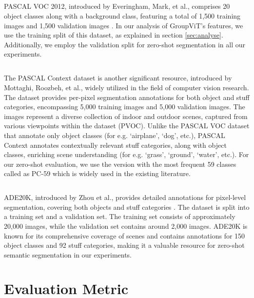 \subsection{\pvoc}
PASCAL VOC 2012, introduced by Everingham, Mark, et al., comprises 20 object classes along with a background class, featuring a total of 1,500 training images and 1,500 validation images \cite{everinghamc}.  In our analysis of GroupViT's features, we use the training split of this dataset, as explained in section \ref{sec:analyse}. Additionally, we employ the validation split for zero-shot segmentation in all our experiments.

\subsection{\pcon}
The PASCAL Context dataset is another significant resource, introduced by Mottaghi, Roozbeh, et al., widely utilized in the field of computer vision research\cite{mottaghi2014role}. The dataset provides per-pixel segmentation annotations for both object and stuff categories, encompassing 5,000 training images and 5,000 validation images. The images represent a diverse collection of indoor and outdoor scenes, captured from various viewpoints within the \pvoc dataset (PVOC). Unlike the PASCAL VOC dataset that annotate only object classes (for e.g. `airplane', `dog', etc.), PASCAL Context annotates contextually relevant stuff categories, along with object classes, enriching scene understanding (for e.g. `grass', `ground', `water', etc.). For our zero-shot evaluation, we use the version with the most frequent 59 classes called as PC-59 which is widely used in the existing literature.

\subsection{\ad}
ADE20K, introduced by  Zhou et al., provides detailed annotations for pixel-level segmentation, covering both objects and stuff categories \cite{zhou2017scene}. The dataset is split into a training set and a validation set. The training set consists of approximately 20,000 images, while the validation set contains around 2,000 images. ADE20K is known for its comprehensive coverage of scenes and contains annotations for 150 object classes and 92 stuff categories, making it a valuable resource for zero-shot semantic segmentation in our experiments.

\section{Evaluation Metric}
